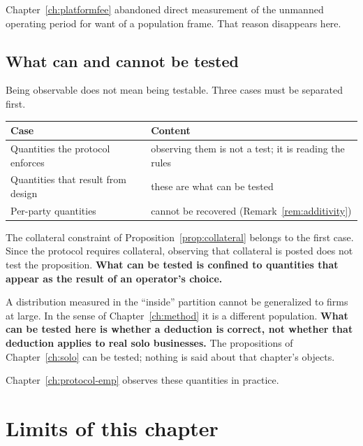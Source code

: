 Chapter~\ref{ch:platformfee} abandoned direct measurement of the unmanned operating period
for want of a population frame. That reason disappears here.

\subsection{What can and cannot be tested}
\label{sec:protocol-testable}

Being observable does not mean being testable. Three cases must be separated first.

\begin{center}
\begin{tabularx}{\textwidth}{@{}lX@{}}
\toprule
Case & Content \\
\midrule
Quantities the protocol enforces & observing them is not a test; it is reading the rules \\
Quantities that result from design & these are what can be tested \\
Per-party quantities & cannot be recovered (Remark~\ref{rem:additivity}) \\
\bottomrule
\end{tabularx}
\label{tab:protocol-testability}
\end{center}

The collateral constraint of Proposition~\ref{prop:collateral} belongs to the first case.
Since the protocol requires collateral, observing that collateral is posted does not test the
proposition.
\textbf{What can be tested is confined to quantities that appear as the result of an
operator's choice.}

\begin{remark}
\label{rem:protocol-population}
A distribution measured in the ``inside'' partition cannot be generalized to firms at large.
In the sense of Chapter~\ref{ch:method} it is a different population.
\textbf{What can be tested here is whether a deduction is correct, not whether that deduction
applies to real solo businesses.}
The propositions of Chapter~\ref{ch:solo} can be tested; nothing is said about that
chapter's objects.
\end{remark}

Chapter~\ref{ch:protocol-emp} observes these quantities in practice.

\section{Limits of this chapter}
\label{sec:protocol-limits}

